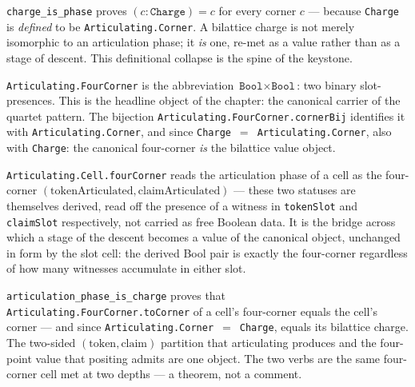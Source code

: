 \begin{theorem}\label{thm:charge-is-phase}\leanok{}
\texttt{charge\_is\_phase} proves $(c : \texttt{Charge}) = c$ for every corner $c$ --- because \texttt{Charge} is \emph{defined} to be \texttt{Articulating.Corner}. A bilattice charge is not merely isomorphic to an articulation phase; it \emph{is} one, re-met as a value rather than as a stage of descent. This definitional collapse is the spine of the keystone.
\end{theorem}
\begin{proposition}\label{thm:four-object}\leanok{}
\texttt{Articulating.FourCorner} is the abbreviation $\texttt{Bool} \times \texttt{Bool}$: two binary slot-presences. This is the headline object of the chapter: the canonical carrier of the quartet pattern. The bijection \texttt{Articulating.FourCorner.cornerBij} identifies it with \texttt{Articulating.Corner}, and since \texttt{Charge}~$=$~\texttt{Articulating.Corner}, also with \texttt{Charge}: the canonical four-corner \emph{is} the bilattice value object.
\end{proposition}
\begin{proposition}\label{thm:cell-fourcorner}\leanok{}
\texttt{Articulating.Cell.fourCorner} reads the articulation phase of a cell as the four-corner $(\text{tokenArticulated}, \text{claimArticulated})$ --- these two statuses are themselves derived, read off the presence of a witness in \texttt{tokenSlot} and \texttt{claimSlot} respectively, not carried as free Boolean data. It is the bridge across which a stage of the descent becomes a value of the canonical object, unchanged in form by the slot cell: the derived Bool pair is exactly the four-corner regardless of how many witnesses accumulate in either slot.
\end{proposition}
\begin{proposition}\label{thm:articulation-phase-is-charge}\leanok{}
\texttt{articulation\_phase\_is\_charge} proves that \texttt{Articulating.FourCorner.toCorner} of a cell's four-corner equals the cell's corner --- and since \texttt{Articulating.Corner}~$=$~\texttt{Charge}, equals its bilattice charge. The two-sided $(\text{token}, \text{claim})$ partition that articulating produces and the four-point value that positing admits are one object. The two verbs are the same four-corner cell met at two depths --- a theorem, not a comment.
\end{proposition}
